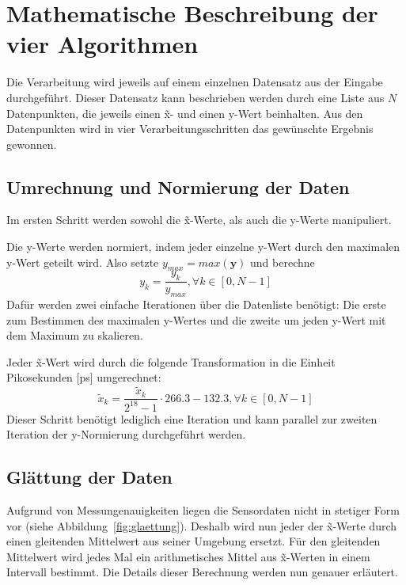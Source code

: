 \section{Mathematische Beschreibung der vier Algorithmen}\label{sec:mat-beschreibung}
Die Verarbeitung wird jeweils auf einem einzelnen Datensatz aus der Eingabe durchgeführt.
Dieser Datensatz kann beschrieben werden durch eine Liste aus $N$ Datenpunkten, die jeweils einen \~x- und einen y-Wert beinhalten.
Aus den Datenpunkten wird in vier Verarbeitungsschritten das gewünschte Ergebnis gewonnen.

\subsection{Umrechnung und Normierung der Daten}\label{subsec:umrechnung-und-normierung}
Im ersten Schritt werden sowohl die \~x-Werte, als auch die y-Werte manipuliert.

Die y-Werte werden normiert, indem jeder einzelne y-Wert durch den maximalen y-Wert geteilt wird.
Also setzte $y_{max} = max(\bm{y})$ und berechne
\[
    y_k = \frac{y_k}{y_{max}}, \forall k \in [0, N - 1]
\]
Dafür werden zwei einfache Iterationen über die Datenliste benötigt:
Die erste zum Bestimmen des maximalen y-Wertes und die zweite um jeden y-Wert mit dem Maximum zu skalieren.

Jeder \~x-Wert wird durch die folgende Transformation in die Einheit Pikosekunden [ps] umgerechnet:
\[
    \tilde{x}_k = \frac{\tilde{x}_k}{2^{18} - 1} \cdot 266.3 - 132.3, \forall k \in [0, N - 1]
\]
Dieser Schritt benötigt lediglich eine Iteration und kann parallel zur zweiten Iteration der y-Normierung durchgeführt werden.

\subsection{Glättung der Daten}\label{subsec:glaettung}
Aufgrund von Messungenauigkeiten liegen die Sensordaten nicht in stetiger Form vor (siehe Abbildung~\ref{fig:glaettung}).
Deshalb wird nun jeder der \~x-Werte durch einen gleitenden Mittelwert aus seiner Umgebung ersetzt.
Für den gleitenden Mittelwert wird jedes Mal ein arithmetisches Mittel aus \~x-Werten in einem Intervall bestimmt.
Die Details dieser Berechnung werden nun genauer erläutert.

